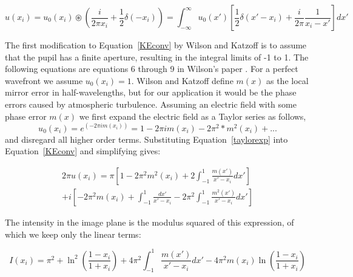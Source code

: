\begin{equation}
    u(x_i)= u_0(x_i) \circledast \left(
        \frac{i}{2\pi x_i}+\frac{1}{2}\delta(-x_i)
    \right)
    =
    \int_{-\infty}^\infty
    u_0(x') \left[
        \frac{1}{2}\delta(x'-x_i)+\frac{i}{2\pi}\frac{1}{x_i-x'}
    \right] dx' 
    \label{KEconv}
\end{equation}

The first modification to Equation~\ref{KEconv} by Wilson and Katzoff is to assume that the pupil has a finite aperture, resulting in the integral limits of -1 to 1. The following equations are equations 6 through 9 in Wilson's paper \citep{wilson1975wavefront}. For a perfect wavefront we assume $u_0 (x_i )=1$.  Wilson and Katzoff define $m(x)$ as the local mirror error in half-wavelengths, but for our application it would be the phase errors caused by atmospheric turbulence. Assuming an electric field with some phase error $m(x)$ we first expand the electric field as a Taylor series as follows,
\begin{equation}
    u_0 (x_i )=e^{(-2\pi i m(x_i ))}=1-2\pi i m(x_i )-2\pi^2*m^2 (x_i )+...
    \label{taylorexp}
\end{equation}
\noindent and disregard all higher order terms. Substituting Equation~\ref{taylorexp} into Equation~\ref{KEconv} and simplifying gives:

\begin{multline}
    2\pi u(x_i ) = 
    \pi 
    \left[ 
        1-2\pi^2 m^2 (x_i )+2\int_{-1}^1 \frac{m(x')}{x'-x_i} dx'
    \right] \\
    +   i \left[
        -2\pi^2 m(x_i)+\int_{-1}^1\frac{dx'}{x'-x_i}
        -
        2\pi^2\int_{-1}^1\frac{m^2(x')}{x'-x_i}dx'
    \right]
\end{multline}



The intensity in the image plane is the modulus squared of this expression, of which we keep only the linear terms:


\begin{equation}
    I(x_i) = \pi^2 + \ln^2 \left(
        \frac{1-x_i}{1+x_i}
    \right)
    +
    4 \pi^2 \int_{-1}^1 \frac{m(x')}{x'-x_i} dx'
    -
    4\pi^2 m(x_i) \ln\left(
        \frac{1-x_i}{1+x_i}
    \right)
\end{equation}

